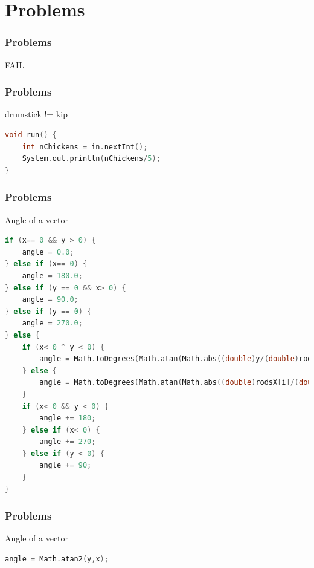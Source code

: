 \documentclass[14pt]{beamer}
\begin{document}
\section{Problems}

\begin{frame}
  \frametitle{Problems}
  \begin{center}
    \Huge{FAIL}
  \end{center}
\end{frame}

\begin{frame}[fragile]
  \frametitle{Problems}
  \begin{block}{drumstick != kip}
\small
\begin{lstlisting}[language=C++]
void run() {
    int nChickens = in.nextInt();
    System.out.println(nChickens/5);
}
\end{lstlisting}
  \end{block}
\end{frame}


\begin{frame}[fragile]
  \frametitle{Problems}
  \begin{block}{Angle of a vector}
\tiny
\vspace*{-5mm}\hspace*{-10mm}\begin{lstlisting}[language=C++]
if (x== 0 && y > 0) {
    angle = 0.0;
} else if (x== 0) {
    angle = 180.0;
} else if (y == 0 && x> 0) {
    angle = 90.0;
} else if (y == 0) {
    angle = 270.0;
} else {
    if (x< 0 ^ y < 0) {
        angle = Math.toDegrees(Math.atan(Math.abs((double)y/(double)rodsX[i])));
    } else {
        angle = Math.toDegrees(Math.atan(Math.abs((double)rodsX[i]/(double)y)));
    }
    if (x< 0 && y < 0) {
        angle += 180;
    } else if (x< 0) {
        angle += 270;
    } else if (y < 0) {
        angle += 90;
    }
}
\end{lstlisting}
  \end{block}
\end{frame}
\begin{frame}[fragile]
  \frametitle{Problems}
  \begin{block}{Angle of a vector}
\begin{lstlisting}[language=C++]
angle = Math.atan2(y,x);
\end{lstlisting}
  \end{block}
\end{frame}
\end{document}
